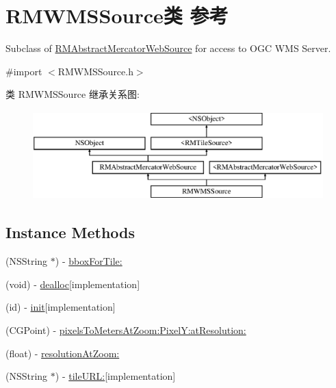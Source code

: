 \hypertarget{interface_r_m_w_m_s_source}{\section{R\-M\-W\-M\-S\-Source类 参考}
\label{interface_r_m_w_m_s_source}
}


Subclass of \hyperlink{interface_r_m_abstract_mercator_web_source}{R\-M\-Abstract\-Mercator\-Web\-Source} for access to O\-G\-C W\-M\-S Server.  




{\ttfamily \#import $<$R\-M\-W\-M\-S\-Source.\-h$>$}

类 R\-M\-W\-M\-S\-Source 继承关系图\-:\begin{figure}[H]
\begin{center}
\leavevmode
\includegraphics[height=3.425076cm]{interface_r_m_w_m_s_source}
\end{center}
\end{figure}
\subsection*{Instance Methods}
\begin{DoxyCompactItemize}
\item 
(N\-S\-String $\ast$) -\/ \hyperlink{interface_r_m_w_m_s_source_a43585213258fb0ea6dcba262c1783630}{bbox\-For\-Tile\-:}
\item 
(void) -\/ \hyperlink{interface_r_m_w_m_s_source_a7df3f99e46ab5030506ddb7155e45911}{dealloc}{\ttfamily  \mbox{[}implementation\mbox{]}}
\item 
(id) -\/ \hyperlink{interface_r_m_w_m_s_source_af93c7233da63c1092768822cf25cb816}{init}{\ttfamily  \mbox{[}implementation\mbox{]}}
\item 
(C\-G\-Point) -\/ \hyperlink{interface_r_m_w_m_s_source_af2b50887be88668a40234d47d63ef900}{pixels\-To\-Meters\-At\-Zoom\-:\-Pixel\-Y\-:at\-Resolution\-:}
\item 
(float) -\/ \hyperlink{interface_r_m_w_m_s_source_a0d5faec0cb4b9032efe1116ee4eab495}{resolution\-At\-Zoom\-:}
\item 
(N\-S\-String $\ast$) -\/ \hyperlink{interface_r_m_w_m_s_source_a87e46d1ac6e1a318323e4785b2c56d98}{tile\-U\-R\-L\-:}{\ttfamily  \mbox{[}implementation\mbox{]}}
\end{DoxyCompactItemize}
